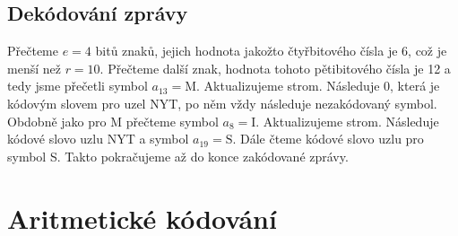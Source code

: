 \subsection{Dekódování zprávy}
Přečteme $e=4$ bitů znaků, jejich hodnota jakožto čtyřbitového čísla je 6, což je menší než $r=10$. Přečteme další znak, hodnota tohoto pětibitového čísla je 12 a tedy jsme přečetli symbol $a_13 = \mathrm{M}$. Aktualizujeme strom. Následuje 0, která je kódovým slovem pro uzel NYT, po něm vždy následuje nezakódovaný symbol. Obdobně jako pro M přečteme symbol $a_8 = \mathrm{I}$. Aktualizujeme strom. Následuje kódové slovo uzlu NYT a symbol $a_19 = \mathrm{S}$. Dále čteme kódové slovo uzlu pro symbol S. Takto pokračujeme až do konce zakódované zprávy.

\section{Aritmetické kódování}
